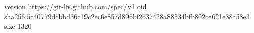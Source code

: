 version https://git-lfs.github.com/spec/v1
oid sha256:5c40779dcbbd36c19c2ec6e857d896bf2637428a88534bfb802ce621e38a58e3
size 1320
